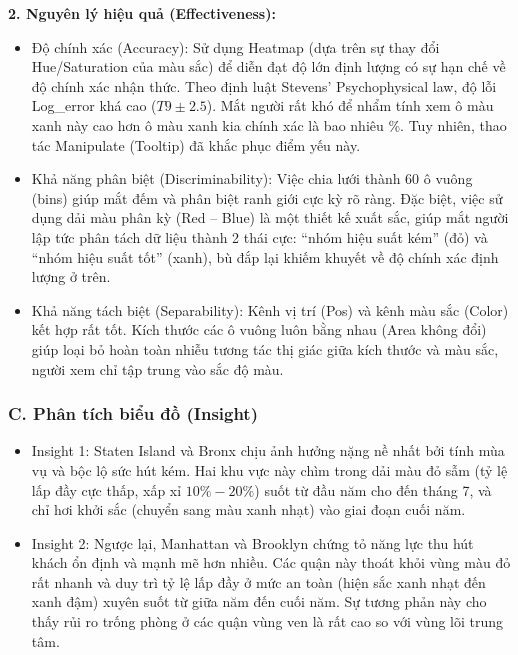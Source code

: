 \textbf{2. Nguyên lý hiệu quả (Effectiveness):}

\begin{itemize}
    \item Độ chính xác (Accuracy): Sử dụng Heatmap (dựa trên sự thay đổi Hue/Saturation của màu sắc) để diễn đạt độ lớn định lượng có sự hạn chế về độ chính xác nhận thức. Theo định luật Stevens' Psychophysical law, độ lỗi Log\_error khá cao ($T9 \pm 2.5$). Mắt người rất khó để nhẩm tính xem ô màu xanh này cao hơn ô màu xanh kia chính xác là bao nhiêu \%. Tuy nhiên, thao tác Manipulate (Tooltip) đã khắc phục điểm yếu này.
    \item Khả năng phân biệt (Discriminability): Việc chia lưới thành 60 ô vuông (bins) giúp mắt đếm và phân biệt ranh giới cực kỳ rõ ràng. Đặc biệt, việc sử dụng dải màu phân kỳ (Red -- Blue) là một thiết kế xuất sắc, giúp mắt người lập tức phân tách dữ liệu thành 2 thái cực: ``nhóm hiệu suất kém'' (đỏ) và ``nhóm hiệu suất tốt'' (xanh), bù đắp lại khiếm khuyết về độ chính xác định lượng ở trên.
    \item Khả năng tách biệt (Separability): Kênh vị trí (Pos) và kênh màu sắc (Color) kết hợp rất tốt. Kích thước các ô vuông luôn bằng nhau (Area không đổi) giúp loại bỏ hoàn toàn nhiễu tương tác thị giác giữa kích thước và màu sắc, người xem chỉ tập trung vào sắc độ màu.
\end{itemize}

\subsubsection*{C. Phân tích biểu đồ (Insight)}

\begin{itemize}
    \item Insight 1: Staten Island và Bronx chịu ảnh hưởng nặng nề nhất bởi tính mùa vụ và bộc lộ sức hút kém. Hai khu vực này chìm trong dải màu đỏ sẫm (tỷ lệ lấp đầy cực thấp, xấp xỉ $10\% - 20\%$) suốt từ đầu năm cho đến tháng 7, và chỉ hơi khởi sắc (chuyển sang màu xanh nhạt) vào giai đoạn cuối năm.
    \item Insight 2: Ngược lại, Manhattan và Brooklyn chứng tỏ năng lực thu hút khách ổn định và mạnh mẽ hơn nhiều. Các quận này thoát khỏi vùng màu đỏ rất nhanh và duy trì tỷ lệ lấp đầy ở mức an toàn (hiện sắc xanh nhạt đến xanh đậm) xuyên suốt từ giữa năm đến cuối năm. Sự tương phản này cho thấy rủi ro trống phòng ở các quận vùng ven là rất cao so với vùng lõi trung tâm.
\end{itemize}
